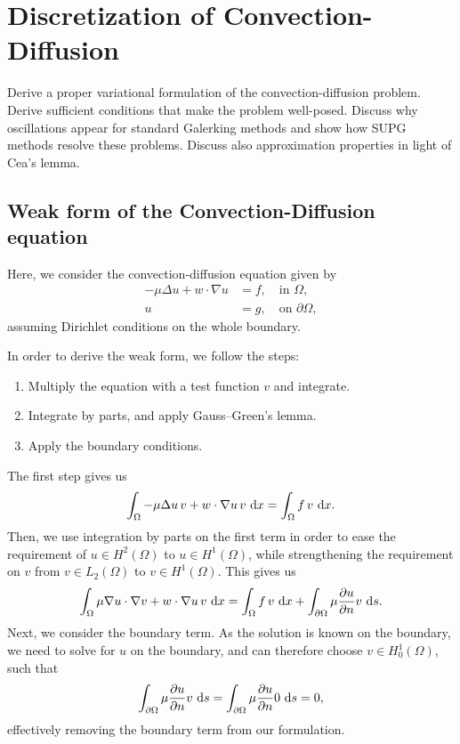 \section{Discretization of Convection-Diffusion}
Derive a proper variational formulation of the convection-diffusion problem.
Derive sufficient conditions that make the problem well-posed.
Discuss why oscillations appear for standard Galerking methods and show how SUPG methods resolve these problems.
Discuss also approximation properties in light of Cea's lemma.

\subsection{Weak form of the Convection-Diffusion equation}
Here, we consider the convection-diffusion equation given by
\begin{equation}
    \begin{split}
        -\mu \Delta u + w \cdot \nabla u &= f, \quad \text{in } \Omega,\\
        u &= g, \quad \text{on } \partial\Omega,
    \end{split}
\end{equation}
assuming Dirichlet conditions on the whole boundary.

In order to derive the weak form, we follow the steps:
\begin{enumerate}
    \item Multiply the equation with a test function $v$ and integrate.

    \item Integrate by parts, and apply Gauss--Green's lemma. %

    \item Apply the boundary conditions.
\end{enumerate}
The first step gives us
\begin{equation}
    \int_\Omega -\mu \Delta u \, v + w \cdot \nabla u \, v \, \mathop{}\!\mathrm{d} x = \int_\Omega f \, v \, \mathop{}\!\mathrm{d} x.
\end{equation}
Then, we use integration by parts on the first term in order to ease the requirement of $u \in H^2(\Omega)$ to $u \in H^1(\Omega)$, while strengthening the requirement on $v$ from $v \in L_2(\Omega)$ to $v \in H^1(\Omega)$.
This gives us
\begin{equation}
    \int_{\Omega} \mu \nabla u \cdot \nabla v  + w \cdot \nabla u \, v \, \mathop{}\!\mathrm{d} x = \int_{\Omega} f \, v \, \mathop{}\!\mathrm{d} x + \int_{\partial\Omega} \mu \frac{\partial u}{\partial n} v \, \mathop{}\!\mathrm{d} s.
\end{equation}
Next, we consider the boundary term.
As the solution is known on the boundary, we need to solve for $u$ on the boundary, and can therefore choose $v \in H_0^1(\Omega)$, such that
\begin{equation}
    \int_{\partial\Omega} \mu \frac{\partial u}{\partial n} v \, \mathop{}\!\mathrm{d} s
    = \int_{\partial\Omega} \mu \frac{\partial u}{\partial n} 0 \, \mathop{}\!\mathrm{d} s = 0,
\end{equation}
effectively removing the boundary term from our formulation.

